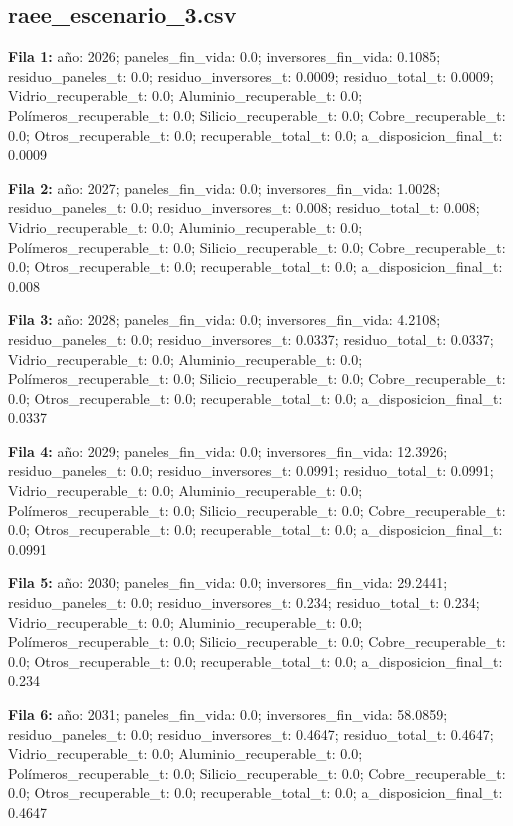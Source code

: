 \subsection*{raee\_escenario\_3.csv}
{\footnotesize\textbf{Fila 1:} año: 2026; paneles\_fin\_vida: 0.0; inversores\_fin\_vida: 0.1085; residuo\_paneles\_t: 0.0; residuo\_inversores\_t: 0.0009; residuo\_total\_t: 0.0009; Vidrio\_recuperable\_t: 0.0; Aluminio\_recuperable\_t: 0.0; Polímeros\_recuperable\_t: 0.0; Silicio\_recuperable\_t: 0.0; Cobre\_recuperable\_t: 0.0; Otros\_recuperable\_t: 0.0; recuperable\_total\_t: 0.0; a\_disposicion\_final\_t: 0.0009\par}
{\footnotesize\textbf{Fila 2:} año: 2027; paneles\_fin\_vida: 0.0; inversores\_fin\_vida: 1.0028; residuo\_paneles\_t: 0.0; residuo\_inversores\_t: 0.008; residuo\_total\_t: 0.008; Vidrio\_recuperable\_t: 0.0; Aluminio\_recuperable\_t: 0.0; Polímeros\_recuperable\_t: 0.0; Silicio\_recuperable\_t: 0.0; Cobre\_recuperable\_t: 0.0; Otros\_recuperable\_t: 0.0; recuperable\_total\_t: 0.0; a\_disposicion\_final\_t: 0.008\par}
{\footnotesize\textbf{Fila 3:} año: 2028; paneles\_fin\_vida: 0.0; inversores\_fin\_vida: 4.2108; residuo\_paneles\_t: 0.0; residuo\_inversores\_t: 0.0337; residuo\_total\_t: 0.0337; Vidrio\_recuperable\_t: 0.0; Aluminio\_recuperable\_t: 0.0; Polímeros\_recuperable\_t: 0.0; Silicio\_recuperable\_t: 0.0; Cobre\_recuperable\_t: 0.0; Otros\_recuperable\_t: 0.0; recuperable\_total\_t: 0.0; a\_disposicion\_final\_t: 0.0337\par}
{\footnotesize\textbf{Fila 4:} año: 2029; paneles\_fin\_vida: 0.0; inversores\_fin\_vida: 12.3926; residuo\_paneles\_t: 0.0; residuo\_inversores\_t: 0.0991; residuo\_total\_t: 0.0991; Vidrio\_recuperable\_t: 0.0; Aluminio\_recuperable\_t: 0.0; Polímeros\_recuperable\_t: 0.0; Silicio\_recuperable\_t: 0.0; Cobre\_recuperable\_t: 0.0; Otros\_recuperable\_t: 0.0; recuperable\_total\_t: 0.0; a\_disposicion\_final\_t: 0.0991\par}
{\footnotesize\textbf{Fila 5:} año: 2030; paneles\_fin\_vida: 0.0; inversores\_fin\_vida: 29.2441; residuo\_paneles\_t: 0.0; residuo\_inversores\_t: 0.234; residuo\_total\_t: 0.234; Vidrio\_recuperable\_t: 0.0; Aluminio\_recuperable\_t: 0.0; Polímeros\_recuperable\_t: 0.0; Silicio\_recuperable\_t: 0.0; Cobre\_recuperable\_t: 0.0; Otros\_recuperable\_t: 0.0; recuperable\_total\_t: 0.0; a\_disposicion\_final\_t: 0.234\par}
{\footnotesize\textbf{Fila 6:} año: 2031; paneles\_fin\_vida: 0.0; inversores\_fin\_vida: 58.0859; residuo\_paneles\_t: 0.0; residuo\_inversores\_t: 0.4647; residuo\_total\_t: 0.4647; Vidrio\_recuperable\_t: 0.0; Aluminio\_recuperable\_t: 0.0; Polímeros\_recuperable\_t: 0.0; Silicio\_recuperable\_t: 0.0; Cobre\_recuperable\_t: 0.0; Otros\_recuperable\_t: 0.0; recuperable\_total\_t: 0.0; a\_disposicion\_final\_t: 0.4647\par}
